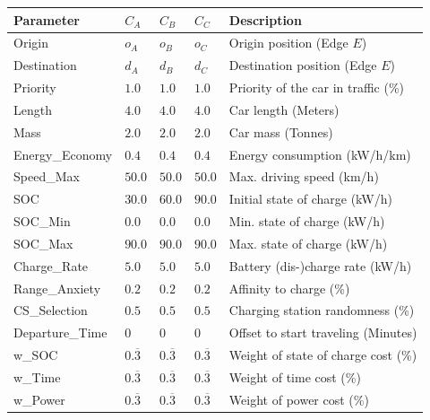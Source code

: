 \begin{table}[h]
	\renewcommand{\arraystretch}{1.3}
	\centering
	\begin{tabularx}{\columnwidth}{llllX}
		\hline
		\textbf{Parameter}          & \textbf{$C_{A}$} & \textbf{$C_{B}$}  & \textbf{$C_{C}$}           & \textbf{Description} \\ \hline
		Origin                      & $o_A$     & $o_B$ & $o_C$    & Origin position (Edge $E$)      \\
		Destination                 & $d_A$    & $d_B$  & $d_C$     & Destination position (Edge $E$) \\
		Priority                  & $1.0$ & $1.0$ & $1.0$ & Priority of the car in traffic (\%)                  \\
		Length                    & $4.0$ & $4.0$ & $4.0$ & Car length (Meters)            \\
		Mass                   & $2.0$ & $2.0$ & $2.0$ & Car mass  (Tonnes)                 \\
		Energy\_Economy				& $0.4$ & $0.4$ & $0.4$ & Energy consumption (kW/h/km) \\
		Speed\_Max				& $50.0$ & $50.0$ & $50.0$ & Max. driving speed (km/h) \\
		SOC                      & $30.0$ & $60.0$ & $90.0$ & Initial state of charge (kW/h)                   \\
		SOC\_Min               & $0.0$ & $0.0$ & $0.0$ & Min. state of charge (kW/h)                     \\
		SOC\_Max              & $90.0$ & $90.0$ & $90.0$ & Max. state of charge (kW/h)                      \\
		Charge\_Rate          & $5.0$ & $5.0$ & $5.0$ & Battery (dis-)charge rate (kW/h)                    \\
		Range\_Anxiety         & $0.2$ & $0.2$ & $0.2$ & Affinity to charge (\%)                     \\
		CS\_Selection		   & $0.5$ & $0.5$ & $0.5$ & Charging station randomness (\%)                    \\ 
		Departure\_Time 	& $0$ & $0$ & $0$ & Offset to start traveling (Minutes)                   \\
		w\_SOC              & $0.\overline{3}$  & $0.\overline{3}$ & $0.\overline{3}$ & Weight of state of charge cost (\%)                   \\
		w\_Time              & $0.\overline{3}$ & $0.\overline{3}$ & $0.\overline{3}$ & Weight of time cost (\%)                     \\
		w\_Power             & $0.\overline{3}$ & $0.\overline{3}$ & $0.\overline{3}$ & Weight of power cost (\%)                      \\ \hline
	\end{tabularx}
\end{table}

